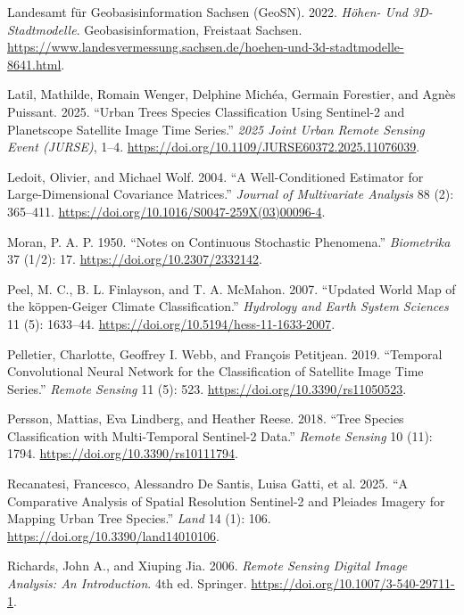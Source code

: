 \documentclass[11pt,a4paper]{scrartcl}
\begin{document}
\begin{CSLReferences}{1}{1}
Landesamt für Geobasisinformation Sachsen (GeoSN). 2022. \emph{H{ö}hen-
Und 3D-Stadtmodelle}. Geobasisinformation, Freistaat Sachsen.
\url{https://www.landesvermessung.sachsen.de/hoehen-und-3d-stadtmodelle-8641.html}.

Latil, Mathilde, Romain Wenger, Delphine Michéa, Germain Forestier, and
Agnès Puissant. 2025. {``Urban Trees Species Classification Using
Sentinel-2 and Planetscope Satellite Image Time Series.''} \emph{2025
Joint Urban Remote Sensing Event (JURSE)}, 1--4.
\url{https://doi.org/10.1109/JURSE60372.2025.11076039}.

Ledoit, Olivier, and Michael Wolf. 2004. {``A Well-Conditioned Estimator
for Large-Dimensional Covariance Matrices.''} \emph{Journal of
Multivariate Analysis} 88 (2): 365--411.
\url{https://doi.org/10.1016/S0047-259X(03)00096-4}.

Moran, P. A. P. 1950. {``Notes on Continuous Stochastic Phenomena.''}
\emph{Biometrika} 37 (1/2): 17. \url{https://doi.org/10.2307/2332142}.

Peel, M. C., B. L. Finlayson, and T. A. McMahon. 2007. {``Updated World
Map of the k{ö}ppen-Geiger Climate Classification.''} \emph{Hydrology
and Earth System Sciences} 11 (5): 1633--44.
\url{https://doi.org/10.5194/hess-11-1633-2007}.

Pelletier, Charlotte, Geoffrey I. Webb, and François Petitjean. 2019.
{``Temporal Convolutional Neural Network for the Classification of
Satellite Image Time Series.''} \emph{Remote Sensing} 11 (5): 523.
\url{https://doi.org/10.3390/rs11050523}.

Persson, Mattias, Eva Lindberg, and Heather Reese. 2018. {``Tree Species
Classification with Multi-Temporal Sentinel-2 Data.''} \emph{Remote
Sensing} 10 (11): 1794. \url{https://doi.org/10.3390/rs10111794}.

Recanatesi, Francesco, Alessandro De Santis, Luisa Gatti, et al. 2025.
{``A Comparative Analysis of Spatial Resolution Sentinel-2 and Pleiades
Imagery for Mapping Urban Tree Species.''} \emph{Land} 14 (1): 106.
\url{https://doi.org/10.3390/land14010106}.

Richards, John A., and Xiuping Jia. 2006. \emph{Remote Sensing Digital
Image Analysis: An Introduction}. 4th ed. Springer.
\url{https://doi.org/10.1007/3-540-29711-1}.


\end{CSLReferences}
\end{document}
